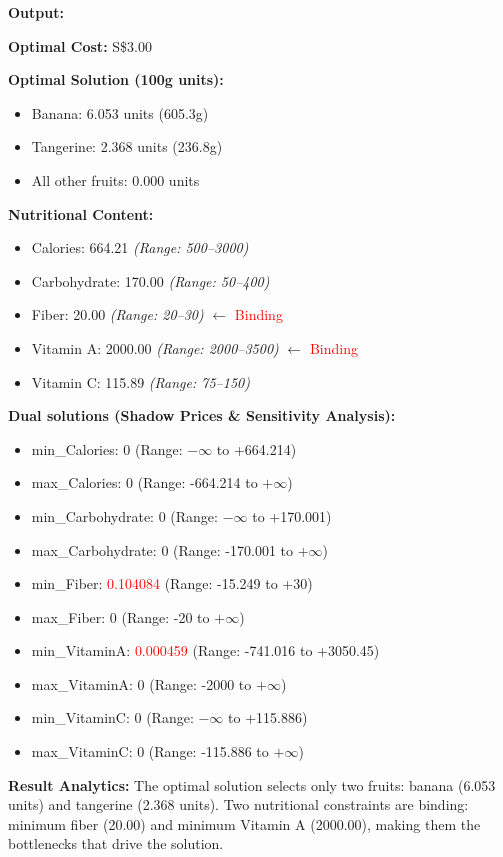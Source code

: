 \documentclass[12pt]{article}
\begin{document}
\begin{enumerate}[label= (\alph*), leftmargin=2em]
\begin{lstlisting}[language=Python, caption={Investment Optimization Python Code}]
\end{lstlisting}

\textbf{Output:}
\begin{tcolorbox}[colback=white, colframe=gray, title=Optimization Results]
\textbf{Optimal Cost:} S\$3.00

\textbf{Optimal Solution (100g units):}
\begin{itemize}[nosep]
    \item Banana: 6.053 units (605.3g)
    \item Tangerine: 2.368 units (236.8g)
    \item All other fruits: 0.000 units
\end{itemize}

\textbf{Nutritional Content:}
\begin{itemize}[nosep]
    \item Calories: 664.21 \textit{(Range: 500--3000)}
    \item Carbohydrate: 170.00 \textit{(Range: 50--400)}
    \item Fiber: 20.00 \textit{(Range: 20--30)} $\leftarrow$ \textcolor{red}{Binding}
    \item Vitamin A: 2000.00 \textit{(Range: 2000--3500)} $\leftarrow$ \textcolor{red}{Binding}
    \item Vitamin C: 115.89 \textit{(Range: 75--150)}
\end{itemize}
\textbf{Dual solutions (Shadow Prices \& Sensitivity Analysis):}
\begin{itemize}[nosep]
    \item min\_Calories: 0 (Range: $-\infty$ to +664.214)
    \item max\_Calories: 0 (Range: -664.214 to $+\infty$)
    \item min\_Carbohydrate: 0 (Range: $-\infty$ to +170.001)
    \item max\_Carbohydrate: 0 (Range: -170.001 to $+\infty$)
    \item min\_Fiber: \textcolor{red}{0.104084} (Range: -15.249 to +30)
    \item max\_Fiber: 0 (Range: -20 to $+\infty$)
    \item min\_VitaminA: \textcolor{red}{0.000459} (Range: -741.016 to +3050.45)
    \item max\_VitaminA: 0 (Range: -2000 to $+\infty$)
    \item min\_VitaminC: 0 (Range: $-\infty$ to +115.886)
    \item max\_VitaminC: 0 (Range: -115.886 to $+\infty$)
\end{itemize}
\end{tcolorbox}
\textbf{Result Analytics:} The optimal solution selects only two fruits: banana (6.053 units) and tangerine (2.368 units). Two nutritional constraints are binding: minimum fiber (20.00) and minimum Vitamin A (2000.00), making them the bottlenecks that drive the solution. 


\end{enumerate}
\end{document}
